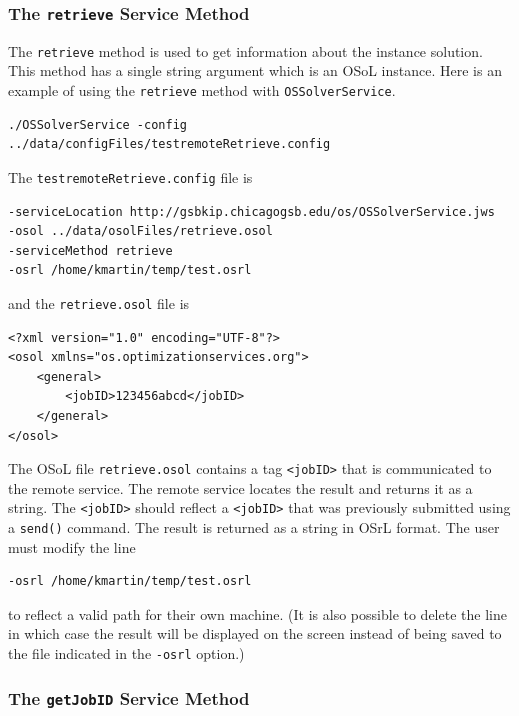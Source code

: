 \documentclass[11pt]{article}
\renewcommand{\_}{{\char"5F}}
\renewcommand{\{}{{\char"7B}}
\renewcommand{\}}{{\char"7D}}
\renewcommand{\^}{{\char"0D}}
\renewcommand{\'}{{\char"0D}}
\begin{document}
\begin{enumerate}[Step 1:]
\subsubsection{The  {\tt retrieve} Service Method}\label{section:retrieve}

The {\tt retrieve} method is used to get information about the instance solution.  This method has a single string argument which is an OSoL instance. Here is an example of using the {\tt retrieve} method with {\tt OSSolverService}.
\begin{verbatim}
./OSSolverService -config ../data/configFiles/testremoteRetrieve.config
\end{verbatim}
The {\tt testremoteRetrieve.config} file is
\begin{verbatim}
-serviceLocation http://gsbkip.chicagogsb.edu/os/OSSolverService.jws
-osol ../data/osolFiles/retrieve.osol
-serviceMethod retrieve
-osrl /home/kmartin/temp/test.osrl
\end{verbatim}
and the {\tt retrieve.osol} file is

\begin{verbatim}
<?xml version="1.0" encoding="UTF-8"?>
<osol xmlns="os.optimizationservices.org">
    <general>
        <jobID>123456abcd</jobID>
    </general>
</osol>
\end{verbatim}

The OSoL file {\tt retrieve.osol} contains a tag {\tt <jobID>} that is communicated to
the remote service. The remote service locates the result and returns it as a string.
The {\tt <jobID>} should reflect a {\tt <jobID>} that was previously submitted
using a {\tt send()} command.
The result is returned as a string in OSrL format.  The user must modify the line
\begin{verbatim}
-osrl /home/kmartin/temp/test.osrl
\end{verbatim}
to reflect a valid path for their own machine.  (It is also possible to delete the line
in which case the result will be displayed on the screen instead of being saved to the
file indicated in the {\tt -osrl} option.)


\subsubsection{The  {\tt getJobID} Service Method}\label{section:getjobid}


\end{enumerate}
\end{document}
